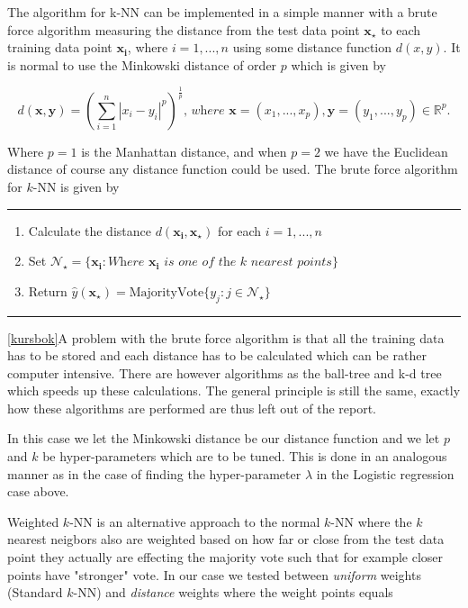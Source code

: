 \documentclass{article}
\begin{document}
The algorithm for k-NN can be implemented in a simple manner with a brute force algorithm measuring the distance from the test data point $\boldsymbol{x_{\star}}$ to each training data point $\boldsymbol{x_{i}}$, where $i = 1,...,n$ using some distance function $d(x,y)$. It is normal to use the Minkowski distance of order $p$ which is given by

\begin{equation}
	d(\boldsymbol{x},\boldsymbol{y}) = \left( \sum_{i=1}^{n} |x_{i} - y_{i}|^{p} \right)^{\frac{1}{p}}\textit{, where } \boldsymbol{x} = (x_1,...,x_p),\boldsymbol{y}=(y_1,...,y_p)
	\in \mathbb{R}^p.
\end{equation}

Where $p=1$ is the Manhattan distance, and when $p=2$ we have the Euclidean distance of course any distance function could be used.
The brute force algorithm for $k$-NN is given by 
\par\noindent\rule{\textwidth}{0.4pt}
\begin{enumerate}
 \item Calculate the distance $d(\boldsymbol{x_{i}},\boldsymbol{x_{\star}})$ for each $i = 1,...,n$
 \item Set $\mathcal{N}_{\star} = \{ \boldsymbol{x_i}: \textit{Where } \boldsymbol{x_i} \textit{ is one of the k nearest points} \}$
 \item Return $\hat{y}(\boldsymbol{x_{\star}}) = \text{MajorityVote}\{y_j : j \in \mathcal{N}_{\star}\} $
\end{enumerate}
\par\noindent\rule{\textwidth}{0.4pt}

\ref{kursbok}A problem with the brute force algorithm is that all the training data has to be stored and each distance has to be calculated which can be rather computer intensive. There are however algorithms as the ball-tree and k-d tree which speeds up these calculations. The general principle is still the same, exactly how these algorithms are performed are thus left out of the report.

In this case we let the Minkowski distance be our distance function and we let $p$ and $k$ be hyper-parameters which are to be tuned. This is done in an analogous manner as in the case of finding the hyper-parameter $\lambda$ in the Logistic regression case above. 

Weighted $k$-NN is an alternative approach to the normal $k$-NN where the $k$ nearest neigbors also are weighted based on how far or close from the test data point they actually are effecting the majority vote such that for example closer points have "stronger" vote. In our case we tested between \textit{uniform} weights (Standard $k$-NN) and \textit{distance} weights where the weight points equals
\end{document}
